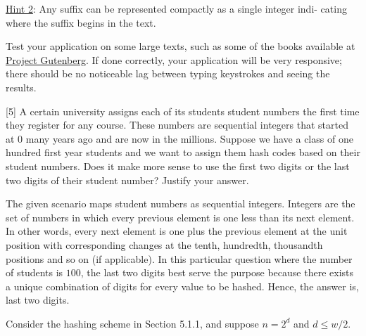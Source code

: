 \documentclass[addpoints]{exam}
\begin{document}
\begin{questions}
		\noindent\underline{Hint 2}: Any suffix can be represented compactly as a single integer indi- cating where the suffix begins in the text.
		
		Test your application on some large texts, such as some of the books available at \href{http://www.gutenberg.org/}{Project Gutenberg}. If done correctly, your application will be very responsive; there should be no noticeable lag between typing keystrokes and seeing the results.
		\begin{solution}
		\end{solution}
\pagebreak
		
		[5]
		A certain university assigns each of its students student numbers the first time they register for any course. These numbers are sequential integers that started at 0 many years ago and are now in the millions. Suppose we have a class of one hundred first year students and we want to assign them hash codes based on their student numbers. Does it make more sense to use the first two digits or the last two digits of their student number? Justify your answer.
		\begin{solution}
			The given scenario maps student numbers as sequential integers. Integers are the set of numbers in which every previous element is one less than its next element. In other words, every next element is one plus the previous element at the unit position with corresponding changes at the tenth, hundredth, thousandth positions and so on (if applicable). In this particular question where the number of students is $100$, the last two digits best serve the purpose because there exists a unique combination of digits for every value to be hashed. Hence, the answer is, last two digits. 
		\end{solution}
\pagebreak
		
		Consider the hashing scheme in Section 5.1.1, and suppose $n = 2^d$ and $d \leq {w/2}$.
		\begin{parts}

\end{parts}
\end{questions}
\end{document}
